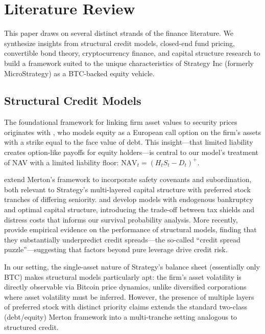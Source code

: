 \section{Literature Review}
\label{sec:literature}

This paper draws on several distinct strands of the finance literature.
We synthesize insights from structural credit models, closed-end fund pricing, convertible bond theory, cryptocurrency finance, and capital structure research to build a framework suited to the unique characteristics of Strategy Inc (formerly MicroStrategy) as a BTC-backed equity vehicle.

\subsection{Structural Credit Models}

The foundational framework for linking firm asset values to security prices originates with \citet{merton1974pricing}, who models equity as a European call option on the firm's assets with a strike equal to the face value of debt.
This insight---that limited liability creates option-like payoffs for equity holders---is central to our model's treatment of NAV with a limited liability floor: $\text{NAV}_t = (H_t S_t - D_t)^+$.

\citet{black1976valuing} extend Merton's framework to incorporate safety covenants and subordination, both relevant to Strategy's multi-layered capital structure with preferred stock tranches of differing seniority.
\citet{leland1994corporate} and \citet{leland1996optimal} develop models with endogenous bankruptcy and optimal capital structure, introducing the trade-off between tax shields and distress costs that informs our survival probability analysis.
More recently, \citet{huang2004structural} provide empirical evidence on the performance of structural models, finding that they substantially underpredict credit spreads---the so-called ``credit spread puzzle''---suggesting that factors beyond pure leverage drive credit risk.

In our setting, the single-asset nature of Strategy's balance sheet (essentially only BTC) makes structural models particularly apt: the firm's asset volatility is directly observable via Bitcoin price dynamics, unlike diversified corporations where asset volatility must be inferred.
However, the presence of multiple layers of preferred stock with distinct priority claims extends the standard two-class (debt/equity) Merton framework into a multi-tranche setting analogous to structured credit.

